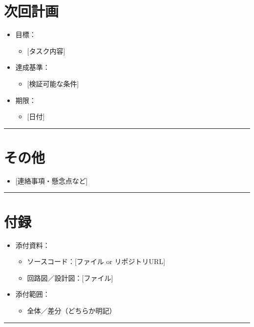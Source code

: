 \documentclass[uplatex,dvipdfmx,a4paper,11pt]{jsarticle}
\newcommand{\sectionrule}{\par\medskip\noindent\rule{\linewidth}{0.6pt}\par\medskip}
\begin{document}
\section{次回計画}

\begin{itemize}
  \item 目標：
    \begin{itemize}
      \item {}[タスク内容]
    \end{itemize}
  \item 達成基準：
    \begin{itemize}
      \item {}[検証可能な条件]
    \end{itemize}
  \item 期限：
    \begin{itemize}
      \item {}[日付]
    \end{itemize}
\end{itemize}

\sectionrule

\section{その他}

\begin{itemize}
  \item {}[連絡事項・懸念点など]
\end{itemize}

\sectionrule

\section{付録}

\begin{itemize}
  \item 添付資料：
    \begin{itemize}
      \item ソースコード：[ファイル or リポジトリURL]
      \item 回路図／設計図：[ファイル]
    \end{itemize}
  \item 添付範囲：
    \begin{itemize}
      \item 全体／差分（どちらか明記）
    \end{itemize}
\end{itemize}

\sectionrule
\end{document}
